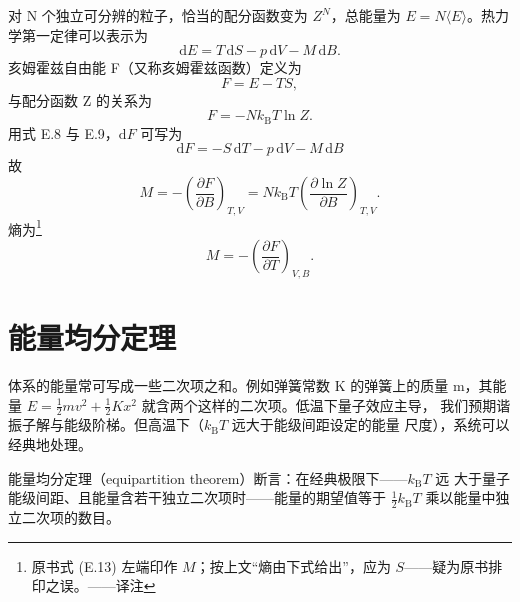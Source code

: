 对 N 个独立可分辨的粒子，恰当的配分函数变为 $Z^{N}$，总能量为
$E=N\langle E\rangle$。热力学第一定律可以表示为
\begin{equation*}
\mathrm{d}E = T\,\mathrm{d}S - p\,\mathrm{d}V - M\,\mathrm{d}B.\tag{E.8}
\end{equation*}
亥姆霍兹自由能 F（又称亥姆霍兹函数）定义为
\begin{equation*}
F = E - TS,\tag{E.9}
\end{equation*}
与配分函数 Z 的关系为
\begin{equation*}
F = -Nk_{\mathrm{B}}T\ln Z.\tag{E.10}
\end{equation*}
用式 E.8 与 E.9，$\mathrm{d}F$ 可写为
\begin{equation*}
\mathrm{d}F = -S\,\mathrm{d}T - p\,\mathrm{d}V - M\,\mathrm{d}B\tag{E.11}
\end{equation*}
故
\begin{equation*}
M = -\left(\frac{\partial F}{\partial B}\right)_{T,V} = Nk_{\mathrm{B}}T\left(\frac{\partial\ln Z}{\partial B}\right)_{T,V}.\tag{E.12}
\end{equation*}
熵为\footnote{原书式 (E.13) 左端印作 $M$；按上文“熵由下式给出”，应为 $S$——疑为原书排印之误。——译注}
\begin{equation*}
M = -\left(\frac{\partial F}{\partial T}\right)_{V,B}.\tag{E.13}
\end{equation*}

\section{能量均分定理}

体系的能量常可写成一些二次项之和。例如弹簧常数 K 的弹簧上的质量 m，其能量
$E=\frac{1}{2}mv^{2}+\frac{1}{2}Kx^{2}$ 就含两个这样的二次项。低温下量子效应主导，
我们预期谐振子解与能级阶梯。但高温下（$k_{\mathrm{B}}T$ 远大于能级间距设定的能量
尺度），系统可以经典地处理。

能量均分定理（equipartition theorem）断言：在经典极限下——$k_{\mathrm{B}}T$ 远
大于量子能级间距、且能量含若干独立二次项时——能量的期望值等于 $\frac{1}{2}k_{\mathrm{B}}T$
乘以能量中独立二次项的数目。

